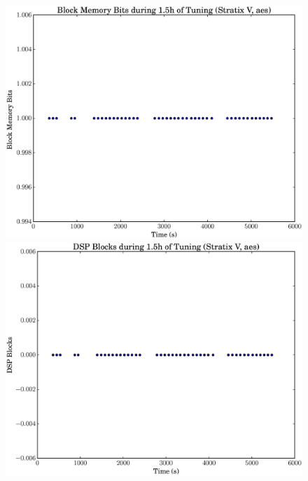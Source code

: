 \documentclass[12pt, a4paper]{article}
\begin{document}
\begin{figure}[htpb]
    \begin{minipage}{.48\textwidth}
        \includegraphics[scale=.25]{aes_block_5400_chstone_StratixV}
    \end{minipage}%
    \hfill
    \begin{minipage}{.48\textwidth}
        \includegraphics[scale=.25]{aes_dsp_5400_chstone_StratixV}
    \end{minipage}%


\end{figure}
\end{document}
